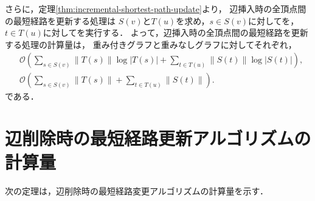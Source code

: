 さらに，定理\ref{thm:incremental-shortest-path-update}より，
辺挿入時の全頂点間の最短経路を更新する処理は
$S(v)$と$T(u)$を求め，$s\in S(v)$に対してを，
$t\in T(u)$に対してを実行する．
よって，辺挿入時の全頂点間の最短経路を更新する処理の計算量は，
重み付きグラフと重みなしグラフに対してそれぞれ，
\begin{align}
  &\mathcal{O}\left(\sum_{s\in S(v)}\|T(s)\|\log|T(s)|+\sum_{t\in T(u)}\|S(t)\|\log|S(t)|\right),
  \label{eq:full-incremental-shortest-path-update-weighted} \\
  &\mathcal{O}\left(\sum_{s\in S(v)}\|T(s)\|+\sum_{t\in T(u)}\|S(t)\|\right).
  \label{eq:full-incremental-shortest-path-update-unweighted}
  \end{align}
である．

\section{辺削除時の最短経路更新アルゴリズムの計算量}
次の定理は，辺削除時の最短経路変更アルゴリズムの計算量を示す．

